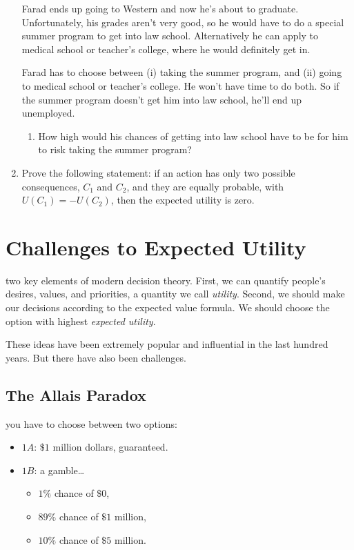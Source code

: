 \documentclass[justified]{tufte-book}
\providecommand{\tightlist}{%
  \setlength{\itemsep}{0pt}\setlength{\parskip}{0pt}}
\renewcommand{\u}{U}
\theoremstyle{definition}
\theoremstyle{definition}
\theoremstyle{definition}
\theoremstyle{remark}
\begin{document}
\begin{enumerate}
  Farad ends up going to Western and now he's about to graduate.
  Unfortunately, his grades aren't very good, so he would have to do a
  special summer program to get into law school. Alternatively he can
  apply to medical school or teacher's college, where he would
  definitely get in.

  Farad has to choose between (i) taking the summer program, and (ii)
  going to medical school or teacher's college. He won't have time to do
  both. So if the summer program doesn't get him into law school, he'll
  end up unemployed.

  \begin{enumerate}
  \def\labelenumii{\alph{enumii}.}
  \setcounter{enumii}{2}
  \tightlist
  \item
    How high would his chances of getting into law school have to be for
    him to risk taking the summer program?
  \end{enumerate}
\item
  Prove the following statement: if an action has only two possible
  consequences, \(C_1\) and \(C_2\), and they are equally probable, with
  \(\u(C_1) = -\u(C_2)\), then the expected utility is zero.
\end{enumerate}

\hypertarget{challenges-to-expected-utility}{%
\chapter{Challenges to Expected
Utility}\label{challenges-to-expected-utility}}

 two key elements of modern decision theory.
First, we can quantify people's desires, values, and priorities, a
quantity we call \emph{utility}. Second, we should make our decisions
according to the expected value formula. We should choose the option
with highest \emph{expected utility}.

These ideas have been extremely popular and influential in the last
hundred years. But there have also been challenges.

\hypertarget{the-allais-paradox}{%
\section{The Allais Paradox}\label{the-allais-paradox}}

 you have to choose between two options:

\begin{itemize}
\tightlist
\item
  \(1A\): \(\$1\) million dollars, guaranteed.
\item
  \(1B\): a gamble\ldots{}

  \begin{itemize}
  \tightlist
  \item
    \(1\%\) chance of \(\$0\),
  \item
    \(89\%\) chance of \(\$1\) million,
  \item
    \(10\%\) chance of \(\$5\) million.
  \end{itemize}
\end{itemize}
\end{document}
